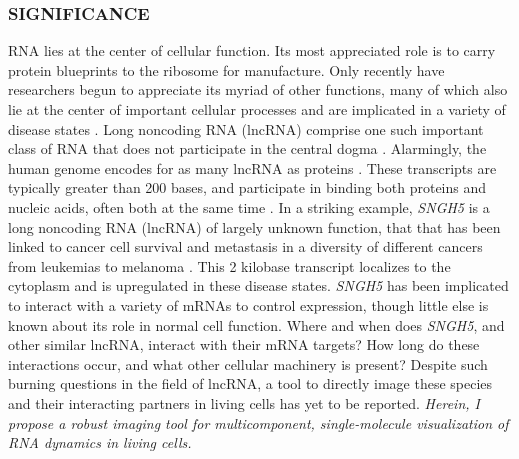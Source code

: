 

\subsubsection*{SIGNIFICANCE}
RNA lies at the center of cellular function. Its most appreciated role is to carry protein blueprints to the ribosome for manufacture.
Only recently have researchers begun to appreciate its myriad of other functions, many of which also lie at the center of important cellular processes and are implicated in a variety of disease states \cite{CechNoncodingRNARevolution2014,DellaRagioneNoncodingRNAschromatin2014,AnastasiadouNoncodingRNAnetworks2018}.
Long noncoding RNA (lncRNA) comprise one such important class of RNA that does not participate in the central dogma \cite{RinnGenomeRegulationLong2012}. Alarmingly, the human genome encodes for as many lncRNA as proteins \cite{Rinntranscriptionalactivityhuman2003,RinnGenomeRegulationLong2012}.
These transcripts are typically greater than 200 bases, and participate in binding both proteins and nucleic acids, often both at the same time \cite{AnastasiadouNoncodingRNAnetworks2018,RinnGenomeRegulationLong2012}.
In a striking example, \textit{SNGH5} is a long noncoding RNA (lncRNA) of largely unknown function, that that has been linked to cancer cell survival and metastasis in a diversity of different cancers from leukemias to melanoma \cite{TanakaRitsukoIntronicU50small2001,DamasSNHG5promotescolorectal2016,ZhaoLongnoncodingRNA2016,HeLncRNASNHG5regulates2017,YanSNHG5promotesproliferation2018,MalncRNASNHG5associated2018,ShenLncRNASNHG5miR26a2018,ZhengLongnoncodingRNA}.
This 2 kilobase transcript localizes to the cytoplasm and is upregulated in these disease states.
\textit{SNGH5} has been implicated to interact with a variety of mRNAs to control expression, though little else is known about its role in normal cell function.
Where and when does \textit{SNGH5}, and other similar lncRNA, interact with their mRNA targets?
How long do these interactions occur, and what other cellular machinery is present?
Despite such burning questions in the field of lncRNA, a tool to directly image these species and their interacting partners in living cells has yet to be reported. \textit{Herein, I propose a robust imaging tool for multicomponent, single-molecule visualization of RNA dynamics in living cells.}


